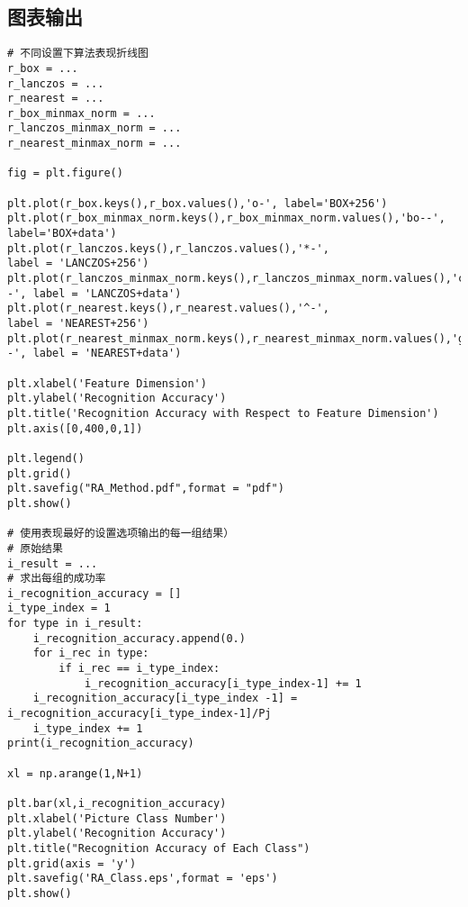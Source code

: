 \subsection{图表输出}
\begin{verbatim}
# 不同设置下算法表现折线图
r_box = ...
r_lanczos = ...
r_nearest = ...
r_box_minmax_norm = ...
r_lanczos_minmax_norm = ...
r_nearest_minmax_norm = ...

fig = plt.figure()

plt.plot(r_box.keys(),r_box.values(),'o-', label='BOX+256')
plt.plot(r_box_minmax_norm.keys(),r_box_minmax_norm.values(),'bo--', label='BOX+data')
plt.plot(r_lanczos.keys(),r_lanczos.values(),'*-', 
label = 'LANCZOS+256')
plt.plot(r_lanczos_minmax_norm.keys(),r_lanczos_minmax_norm.values(),'c*--', label = 'LANCZOS+data')
plt.plot(r_nearest.keys(),r_nearest.values(),'^-', 
label = 'NEAREST+256')
plt.plot(r_nearest_minmax_norm.keys(),r_nearest_minmax_norm.values(),'g^--', label = 'NEAREST+data')

plt.xlabel('Feature Dimension')
plt.ylabel('Recognition Accuracy')
plt.title('Recognition Accuracy with Respect to Feature Dimension')
plt.axis([0,400,0,1])

plt.legend()
plt.grid()
plt.savefig("RA_Method.pdf",format = "pdf")
plt.show()

# 使用表现最好的设置选项输出的每一组结果）
# 原始结果
i_result = ...
# 求出每组的成功率
i_recognition_accuracy = []
i_type_index = 1
for type in i_result:
    i_recognition_accuracy.append(0.)
    for i_rec in type:
        if i_rec == i_type_index:
            i_recognition_accuracy[i_type_index-1] += 1
    i_recognition_accuracy[i_type_index -1] = i_recognition_accuracy[i_type_index-1]/Pj
    i_type_index += 1
print(i_recognition_accuracy)

xl = np.arange(1,N+1)

plt.bar(xl,i_recognition_accuracy)
plt.xlabel('Picture Class Number')
plt.ylabel('Recognition Accuracy')
plt.title("Recognition Accuracy of Each Class")
plt.grid(axis = 'y')
plt.savefig('RA_Class.eps',format = 'eps')
plt.show()
\end{verbatim}



